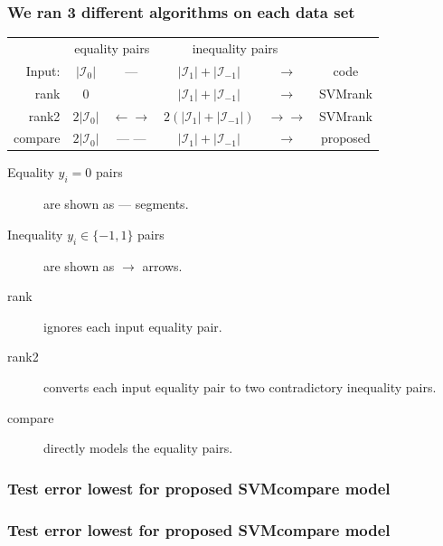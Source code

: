\documentclass{beamer}
\begin{document}
\begin{frame}
  \frametitle{We ran 3 different algorithms on each data set}
  \begin{center}
        \begin{tabular}{r|cc|cc|c|}
&    \multicolumn{2}{c|}{equality pairs}
&    \multicolumn{2}{c|}{inequality pairs}\\
Input:    & $|\mathcal I_0|$ %
    & --- 
    & $|\mathcal I_1|+|\mathcal I_{-1}|$ %
    & $\rightarrow$ &
    code
    \\
    \hline
    rank 
    & 0 
    & 
    & $|\mathcal I_1|+|\mathcal I_{-1}|$ 
    & $\rightarrow$ &
    SVMrank
    \\
    \hline
    rank2 
    & $2|\mathcal I_0|$ 
    & $\leftarrow \rightarrow$
    & $2(|\mathcal I_1|+|\mathcal I_{-1}|)$ 
    & $\rightarrow \rightarrow$ &
    SVMrank
    \\
    \hline
    compare 
    & $2|\mathcal I_0|$ 
    & --- --- 
    & $|\mathcal I_1|+|\mathcal I_{-1}|$ 
    & $\rightarrow$ &
    proposed
    \\
    \hline
  \end{tabular}
  \end{center}
  \begin{description}
  \item[Equality $y_i=0$ pairs] are shown as ---  
    segments.
  \item[Inequality $y_i\in\{-1,1\}$ pairs]
    are shown as $\rightarrow$  arrows.
  \item[rank] ignores each input equality pair.
  \item[rank2] converts each input equality pair
    to two contradictory inequality pairs.
  \item[compare] directly models the equality pairs.
  \end{description}
\end{frame}

%

\begin{frame}
  \frametitle{Test error lowest for proposed SVMcompare model}
  \begin{minipage}{1.0\linewidth}
    \hskip -0.5cm
      
  \end{minipage}
\end{frame}

\begin{frame}
  \frametitle{Test error lowest for proposed SVMcompare model}
  \begin{minipage}{1.0\linewidth}
    \hskip -0.5cm
      
  \end{minipage}
\end{frame}
\end{document}
